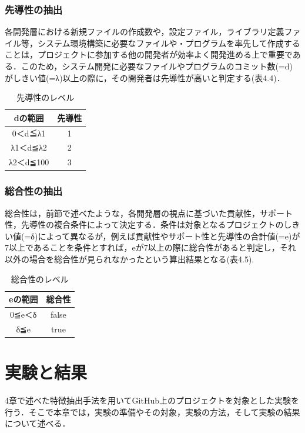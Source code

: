 \documentclass{funthesis}
\begin{document}
\subsection{先導性の抽出}
各開発層における新規ファイルの作成数や，設定ファイル，ライブラリ定義ファイル等，システム環境構築に必要なファイルや・プログラムを率先して作成することは，プロジェクトに参加する他の開発者が効率よく開発進める上で重要である．このため，システム開発に必要なファイルやプログラムのコミット数(=d)がしきい値(=λ)以上の際に，その開発者は先導性が高いと判定する(表4.4)．
\begin{table}[H]
  \begin{center}
    \begin{tabular}{|c||c|} \hline
      dの範囲 & 先導性  \\ \hline
      0＜d≦λ1 & 1 \\ \hline
      λ1＜d≦λ2 & 2 \\ \hline
      λ2＜d≦100 & 3  \\ \hline
    \end{tabular}
  \end{center}
  \caption{先導性のレベル}    \label{sample}
\end{table}


\subsection{総合性の抽出}

総合性は，前節で述べたような，各開発層の視点に基づいた貢献性，サポート性，先導性の複合条件によって決定する．条件は対象となるプロジェクトのしきい値(=δ)によって異なるが，例えば貢献性やサポート性と先導性の合計値(=e)が7以上であることを条件とすれば，eが7以上の際に総合性があると判定し，それ以外の場合を総合性が見られなかったという算出結果となる(表4.5).
\begin{table}[H]
  \begin{center}
    \begin{tabular}{|c||c|} \hline
      eの範囲 & 総合性  \\ \hline
      0≦e＜δ & false \\ \hline
      δ≦e & true \\ \hline
    \end{tabular}
  \end{center}
  \caption{総合性のレベル}    \label{sample}
\end{table}
\chapter{実験と結果}
4章で述べた特徴抽出手法を用いてGitHub上のプロジェクトを対象とした実験を行う．そこで本章では，実験の準備やその対象，実験の方法，そして実験の結果について述べる．
\end{document}
